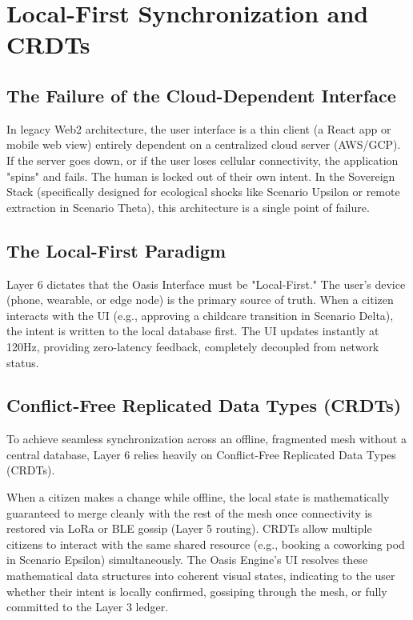 \chapter{Local-First Synchronization and CRDTs}

\section{The Failure of the Cloud-Dependent Interface}
In legacy Web2 architecture, the user interface is a thin client (a React app or mobile web view) entirely dependent on a centralized cloud server (AWS/GCP). If the server goes down, or if the user loses cellular connectivity, the application "spins" and fails. The human is locked out of their own intent. In the Sovereign Stack (specifically designed for ecological shocks like Scenario Upsilon or remote extraction in Scenario Theta), this architecture is a single point of failure. 

\section{The Local-First Paradigm}
Layer 6 dictates that the Oasis Interface must be "Local-First." The user's device (phone, wearable, or edge node) is the primary source of truth. When a citizen interacts with the UI (e.g., approving a childcare transition in Scenario Delta), the intent is written to the local database first. The UI updates instantly at 120Hz, providing zero-latency feedback, completely decoupled from network status.

\section{Conflict-Free Replicated Data Types (CRDTs)}
To achieve seamless synchronization across an offline, fragmented mesh without a central database, Layer 6 relies heavily on Conflict-Free Replicated Data Types (CRDTs). 

When a citizen makes a change while offline, the local state is mathematically guaranteed to merge cleanly with the rest of the mesh once connectivity is restored via LoRa or BLE gossip (Layer 5 routing). CRDTs allow multiple citizens to interact with the same shared resource (e.g., booking a coworking pod in Scenario Epsilon) simultaneously. The Oasis Engine's UI resolves these mathematical data structures into coherent visual states, indicating to the user whether their intent is locally confirmed, gossiping through the mesh, or fully committed to the Layer 3 ledger.

